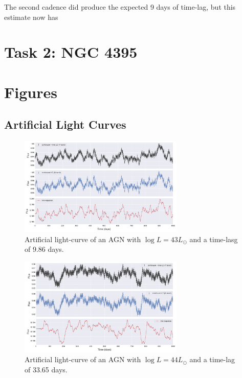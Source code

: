 \documentclass[letterpaper, oneside]{article}
\begin{document}
 The second cadence did produce the expected 9 days of time-lag, but this estimate now has 


\section*{Task 2: NGC 4395}








\section*{Figures}

\subsection{Artificial Light Curves}

\begin{figure}[h]
	\centering
	\includegraphics[width=0.7\textwidth]{../lc_plots/art_lcs_logL43.pdf}
	\caption{Artificial light-curve of an AGN with $\log L = 43 L_{\odot}$ and a time-lasg of 9.86 days.}
	\label{fig:art_lcs_L43}
\end{figure}

\begin{figure}[h]
	\centering
	\includegraphics[width=0.7\textwidth]{../lc_plots/art_lcs_logL44.pdf}
	\caption{Artificial light-curve of an AGN with $\log L = 44 L_{\odot}$ and a time-lag of 33.65 days.}
	\label{fig:art_lcs_L44}
\end{figure}
\end{document}
